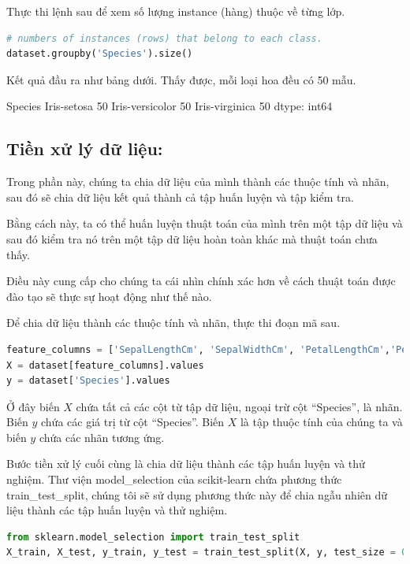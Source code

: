 Thực thi lệnh sau để xem số lượng instance (hàng) thuộc về từng lớp.

\begin{lstlisting}[language=Python]
# numbers of instances (rows) that belong to each class.
dataset.groupby('Species').size()
\end{lstlisting}

Kết quả đầu ra như bảng dưới. Thấy được, mỗi loại hoa đều có 50 mẫu.

\begin{terminaloutput}
Species
Iris-setosa        50
Iris-versicolor    50
Iris-virginica     50
dtype: int64
\end{terminaloutput}

\subsection{Tiền xử lý dữ liệu:}

Trong phần này, chúng ta chia dữ liệu của mình thành các thuộc tính và nhãn,
sau đó sẽ chia dữ liệu kết quả thành cả tập huấn luyện và tập kiểm tra.

Bằng cách này, ta có thể huấn luyện thuật toán của mình trên
một tập dữ liệu và sau đó kiểm tra nó trên một tập dữ liệu hoàn toàn khác
mà thuật toán chưa thấy.

Điều này cung cấp cho chúng ta cái nhìn chính xác hơn về cách thuật toán
được đào tạo sẽ thực sự hoạt động như thế nào.

Để chia dữ liệu thành các thuộc tính và nhãn, thực thi đoạn mã sau.

\begin{lstlisting}[language=Python]
feature_columns = ['SepalLengthCm', 'SepalWidthCm', 'PetalLengthCm','PetalWidthCm']
X = dataset[feature_columns].values
y = dataset['Species'].values
\end{lstlisting}

Ở đây biến $X$ chứa tất cả các cột từ tập dữ liệu, ngoại trừ cột \enquote{Species},
là nhãn. Biến $y$ chứa các giá trị từ cột \enquote{Species}. Biến $X$ là tập thuộc tính
của chúng ta và biến $y$ chứa các nhãn tương ứng.

Bước tiền xử lý cuối cùng là chia dữ liệu thành các tập huấn luyện và thử nghiệm.
Thư viện model\_selection của scikit-learn chứa phương thức train\_test\_split,
chúng tôi sẽ sử dụng phương thức này để chia ngẫu nhiên dữ liệu thành
các tập huấn luyện và thử nghiệm.

\begin{lstlisting}[language=Python]
from sklearn.model_selection import train_test_split
X_train, X_test, y_train, y_test = train_test_split(X, y, test_size = 0.3, random_state = 0)
\end{lstlisting}


